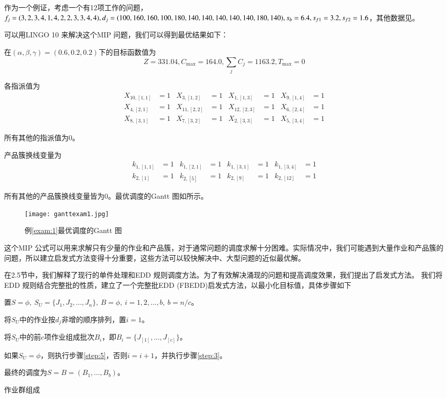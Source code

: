 \begin{example}
作为一个例证，考虑一个有12项工作的问题，$f_j=(3,2,3,4,1,4,2,2,3,3,4,4),d_j=(100,160,160,100,180,\\
140,140,140,140,140,180,140),s_b=6.4,s_{f1}=3.2,s_{f2}=1.6$，其他数据见。\label{exam:1}
\end{example}

可以用LINGO 10 来解决这个MIP 问题，我们可以得到最优结果如下：

在$(\alpha,\beta,\gamma) = (0.6,0.2,0.2)$下的目标函数值为
$$Z = 331.04, C_{\max} = 164.0, {\textstyle\sum_j C_j = 1163.2}, T_{\max} = 0$$

各指派值为
\begin{align*}
 X_{10,[1,1]} & = 1 & X_{3,[1,2]} & = 1 & X_{1,[1,3]} & = 1 & X_{9,[1,4]} & = 1\\
 X_{4,[2,1]} & = 1 & X_{11,[2,2]} & = 1 & X_{12,[2,3]} & = 1 & X_{6,[2,4]} & = 1\\
 X_{8,[3,1]} & = 1 & X_{7,[3,2]} & = 1 & X_{2,[3,3]} & = 1 & X_{5,[3,4]} & = 1
\end{align*}

所有其他的指派值为0。

产品簇换线变量为
\begin{align*}
k_{1,[1,1]} & = 1 & k_{1,[2,1]} & = 1 & k_{1,[3,1]} & = 1 & k_{1,[3,4]} & = 1 \\
k_{2,[1]} & = 1 & k_{2,[5]} & = 1 & k_{2,[9]} & = 1 & k_{2,[12]} & = 1
\end{align*}

所有其他的产品簇换线变量皆为0。最优调度的Gantt 图如所示。
\begin{figure}[h]
\texttt{[image: ganttexam1.jpg]}
\caption{例\ref{exam:1}最优调度的Gantt 图\label{fig:gantt1}}
\end{figure}

这个MIP 公式可以用来求解只有少量的作业和产品簇，对于通常问题的调度求解十分困难。实际情况中，我们可能遇到大量作业和产品簇的问题，所以建立启发式方法变得十分重要，这些方法可以较快解决中、大型问题的近似最优解。

在2.5节中，我们解释了现行的单件处理和EDD 规则调度方法。为了有效解决涌现的问题和提高调度效果，我们提出了启发式方法。
我们将EDD 规则结合完整批的性质，建立了一个完整批EDD (FBEDD)启发式方法，以最小化目标值，具体步骤如下

\begin{asparaenum}
\renewcommand{\labelenumi}{\heiti 步骤\theenumi~}
\item 置$S=\phi,\ S_U = \{J_1,J_2,...,J_n\},\ B=\phi,\ i=1,2,...,b,\ b = n/c$。
\item 将$S_U$中的作业按$d_j$非增的顺序排列，置$i=1$。
\item 将$S_U$中的前$c$项作业组成批次$B_i$，即$B_i = \{J_{[1]},...,J_{[c]}\}$\label{step:3}。
\item 如果$S_U = \phi$，则执行{\heiti 步骤}\ref{step:5}，否则$i=i+1$，并执行{\heiti 步骤}\ref{step:3}。
\item 最终的调度为$S=B=(B_1,...,B_b)$。\label{step:5}
\end{asparaenum}
作业群组成